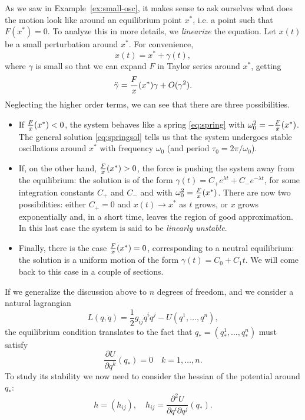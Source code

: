 \documentclass[english,fontsize=11pt,paper=a5,oneside]{scrbook}
\let\d\relax
\DeclareMathOperator{\d}{d}
\theoremstyle{definition}
\begin{document}
As we saw in Example~\ref{ex:small-osc}, it makes sense to ask ourselves what does the motion look like around an equilibrium point $x^*$, i.e. a point such that $F(x^*) = 0$.
To analyze this in more details, we \emph{linearize} the equation. 
Let $x(t)$ be a small perturbation around $x^*$. For convenience,
\begin{equation}
    x(t) = x^* + \gamma(t),
\end{equation}
where $\gamma$ is small so that we can expand $F$ in Taylor series around $x^*$, getting
\begin{equation}
    \ddot \gamma = \frac{\d F}{\d x}(x^*)\gamma + O(\gamma^2).
\end{equation}
Neglecting the higher order terms, we can see that there are three possibilities.
\begin{itemize}
    \item If $\frac{\d F}{\d x}(x^*) < 0$, the system behaves like a spring \eqref{eq:spring} with $\omega_0^2 = -\frac{\d F}{\d x}(x^*)$. The general solution \eqref{eq:springsol} tells us that the system undergoes stable oscillations around $x^*$ with frequency $\omega_0$ (and period $\tau_0 = 2\pi/\omega_0$).
    \item If, on the other hand, $\frac{\d F}{\d x}(x^*) > 0$, the force is pushing the system away from the equilibrium: the solution is of the form $\gamma(t) = C_+ e^{\lambda t} + C_- e^{-\lambda t}$, for some integration constants $C_+$ and $C_-$ and with $\omega_0^2 = \frac{\d F}{\d x}(x^*)$. There are now two possibilities: either $C_+ = 0$ and $x(t) \to x^*$ as $t$ grows, or $x$ grows exponentially and, in a short time, leaves the region of good approximation. In this last case the system is said to be \emph{linearly unstable}.
    \item Finally, there is the case $\frac{\d F}{\d x}(x^*) = 0$, corresponding to a neutral equilibrium: the solution is a uniform motion of the form $\gamma(t) = C_0 + C_1 t$.
    We will come back to this case in a couple of sections.
\end{itemize}

If we generalize the discussion above to $n$ degrees of freedom, and we consider a natural lagrangian
\begin{equation}
    L(q,\dot q) = \frac12 g_{ij} \dot q^i \dot q^j - U(q^1, \ldots, q^n),
\end{equation}
the equilibrium condition translates to the fact that $q_* = (q_*^1, \ldots, q_*^n)$ must satisfy
\begin{equation}
    \frac{\partial U}{\partial q^k} (q_*) = 0 \quad k=1,\ldots,n.
\end{equation}
To study its stability we now need to consider the hessian of the potential around $q_*$:
\begin{equation}
    h = (h_{ij}),\quad h_{ij} = \frac{\partial^2 U}{\partial q^i\partial q^j} (q_*).
\end{equation}
\end{document}
